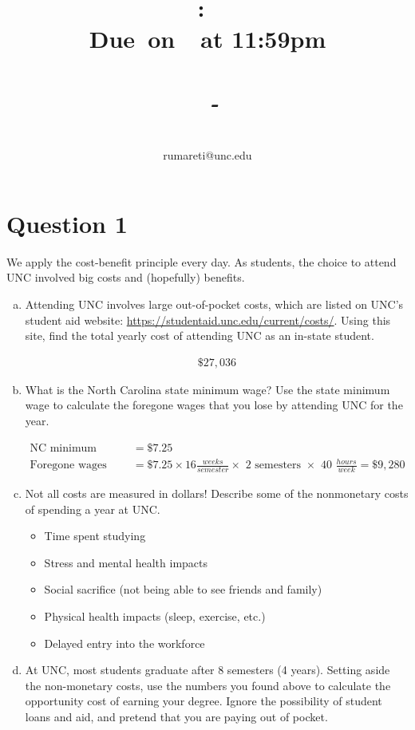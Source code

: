 \documentclass{article}
\title{
    \vspace{2in}
    \textmd{\textbf{\hmwkClass:\ \hmwkTitle}}\\
    \normalsize\vspace{0.1in}\small{\textbf{Due\ on\ \hmwkDueDate\ at 11:59pm}}\\
    \normalsize\text{Tuesday/Thursday 3:30-4:45, Genome Sciences 100}\\
    \vspace{0.1in}\large{\textit{\hmwkClassInstructor\ - \hmwkClassTime}}
    \vspace{3in}
}
\author{\hmwkAuthorName\\\small{rumareti@unc.edu}}
\date{}
\newcommand{\question}[1]{\pagebreak\section{Question #1}}
\begin{document}
\maketitle

\question{1}

We apply the cost-benefit principle every day. As students, the choice to attend UNC involved big costs and (hopefully) benefits.

\begin{enumerate}[(a)]

    \item Attending UNC involves large out-of-pocket costs, which are listed
    on UNC's student aid website:
    \url{https://studentaid.unc.edu/current/costs/}.
    Using this site, find the total yearly cost of attending UNC as an
    in-state student.

    \begin{align*}
        \$27,036
    \end{align*}

    \item What is the North Carolina state minimum wage? Use the state minimum wage to calculate the foregone wages that you lose by attending UNC for the year.
        
    \begin{align*}
        \text{NC minimum wage } &= \$7.25\\
        \text{Foregone wages } &= \$7.25 \times 16 \frac{weeks}{semester} \times \text{ 2 semesters } \times \text{ 40 }\frac{hours}{week} = \$9,280
    \end{align*}

    \item Not all costs are measured in dollars! Describe some of the nonmonetary costs of spending a year at UNC.
    
    \begin{itemize}
        \item Time spent studying
        \item Stress and mental health impacts
        \item Social sacrifice (not being able to see friends and family)
        \item Physical health impacts (sleep, exercise, etc.)
        \item Delayed entry into the workforce
    \end{itemize}

    \item At UNC, most students graduate after 8 semesters (4 years). Setting aside the non-monetary costs, use the numbers you found
    above to calculate the opportunity cost of earning your degree. Ignore the possibility of student loans and aid, and pretend that
    you are paying out of pocket.


\end{enumerate}
\end{document}
